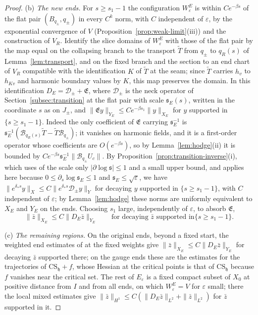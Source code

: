 \documentclass[11pt]{amsart}
\theoremstyle{definition}
\theoremstyle{remark}
\theoremstyle{plain}
\numberwithin{equation}{section}
\newcommand{\eps}{\varepsilon}
\begin{document}
\begin{proof}
(b) \emph{The new ends.} For $s\ge s_1-1$ the configuration $W^E_\eps$ is within
$Ce^{-\beta s}$ of the flat pair $(B_{q_\pm},q_\pm)$ in every $C^k$ norm, with $C$
independent of $\eps$, by the exponential convergence of $V$
(Proposition~\ref{prop:weak-limit}(iii)) and the construction of $V_R$. Identify
the slice domains of $W^E_\eps$ with those of the flat pair by the map equal on the
collapsing branch to the transport $\widetilde T$ from $q_\pm$ to $q_R(s)$
of Lemma~\ref{lem:transport}, and on the fixed branch
and the section to an end chart of $V_R$ compatible with the identification $K$
of $\widetilde T$ at the seam; since $\widetilde T$ carries $h_v$ to $h_{Kv}$ and
harmonic boundary values by $K$, this map preserves the domain. In this
identification $D_E=\mathcal D_\pm+\mathfrak E$, where $\mathcal D_\pm$ is the neck
operator of Section~\ref{subsec:transition} at the flat pair with scale
${\mathfrak s}_E(s)$, written in the coordinate $s$ as on $J_\pm$, and
$\|\mathfrak Ey\|_{Y_E}\le Ce^{-\beta s_1}\|y\|_{X_E}$ for $y$ supported in
$\{s\ge s_1-1\}$. Indeed the only coefficient of $\mathfrak E$ carrying ${\mathfrak s}_E^{-1}$
is ${\mathfrak s}_E^{-1}(\mathcal B_{q_R(s)}\widetilde T-\widetilde T\mathcal B_{q_\pm})$; it
vanishes on harmonic fields, and it is a first-order operator whose coefficients
are $O(e^{-\beta s})$, so by Lemma~\ref{lem:hodge}(ii) it is bounded by
$Ce^{-\beta s}{\mathfrak s}_E^{-1}\|\mathcal B_{q_\pm}U_c\|$. By
Proposition~\ref{prop:transition-inverse}(i), which uses of the scale only
$|\partial\log{\mathfrak s}|\le1$ and a small upper bound, and applies here because
$0\le\partial_s\log{\mathfrak s}_E\le1$ and ${\mathfrak s}_E\le\sqrt\eps$, we have
$\|e^{\delta_*s}y\|_X\le C\|e^{\delta_*s}\mathcal D_\pm y\|_Y$ for decaying $y$
supported in $\{s\ge s_1-1\}$, with $C$ independent of $\eps$; by
Lemma~\ref{lem:hodge} these norms are uniformly equivalent to $X_E$ and $Y_E$ on
the ends. Choosing $s_1$ large, independently of $\eps$, to absorb $\mathfrak E$,
\[
\|\bar z\|_{X_E}\le C\|D_E\bar z\|_{Y_E}\qquad\text{for decaying $\bar z$ supported in
$\{s\ge s_1-1\}$.}
\]

(c) \emph{The remaining regions.} On the original ends, beyond a fixed start, the
weighted end estimates of \cite[Section~4.2.1]{DFL} at the fixed weights give
$\|\bar z\|_{X_E}\le C\|D_E\bar z\|_{Y_E}$ for decaying $\bar z$ supported there; on the gauge
ends these are the estimates for the trajectories of $\mathrm{CS}_{\mathfrak h}+f$, whose
Hessian at the critical points is that of $\mathrm{CS}_{\mathfrak h}$ because $f$ vanishes near
the critical set. The
rest of $E_\eps$ is a fixed compact subset of $X_0$ at positive distance from $I$
and from all ends, on which $W^E_\eps=V$ for $\eps$ small; there the local mixed
estimates \cite[Theorem~4.17 and Remark~4.19]{DFL} give
$\|\bar z\|_{H^1}\le C(\|D_E\bar z\|_{L^2}+\|\bar z\|_{L^2})$ for $\bar z$ supported in it.


\end{proof}
\end{document}
